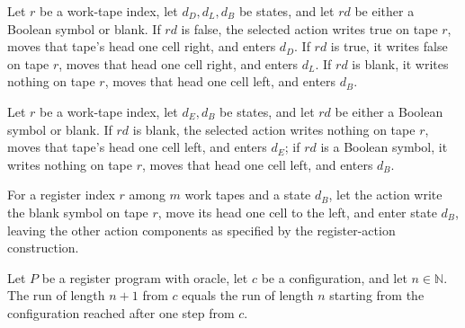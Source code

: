 \begin{definition}
\label{Complexity.LogProg.decDAct}
\leanok
{}
Let $r$ be a work-tape index, let $d_D,d_L,d_B$ be states, and let $rd$ be either a
Boolean symbol or blank. If $rd$ is false, the selected action writes true on tape $r$,
moves that tape's head one cell right, and enters $d_D$. If $rd$ is true, it writes
false on tape $r$, moves that head one cell right, and enters $d_L$. If $rd$ is blank,
it writes nothing on tape $r$, moves that head one cell left, and enters $d_B$.
\end{definition}

\begin{definition}
\label{Complexity.LogProg.decLAct}
\leanok
{}
Let $r$ be a work-tape index, let $d_E,d_B$ be states, and let $rd$ be either a Boolean
symbol or blank. If $rd$ is blank, the selected action writes nothing on tape $r$, moves
that tape's head one cell left, and enters $d_E$; if $rd$ is a Boolean symbol, it writes
nothing on tape $r$, moves that head one cell left, and enters $d_B$.
\end{definition}

\begin{definition}
\label{Complexity.LogProg.decEAct}
\leanok
{}
For a register index $r$ among $m$ work tapes and a state $d_B$, let the action write
the blank symbol on tape $r$, move its head one cell to the left, and enter state $d_B$,
leaving the other action components as specified by the register-action construction.
\end{definition}

\begin{lemma}
\label{Complexity.LogProg.rrun_succ_left}
\leanok
{}
Let $P$ be a register program with oracle, let $c$ be a configuration, and let
$n\in\mathbb N$. The run of length $n+1$ from $c$ equals the run of length $n$ starting
from the configuration reached after one step from $c$.
\end{lemma}

